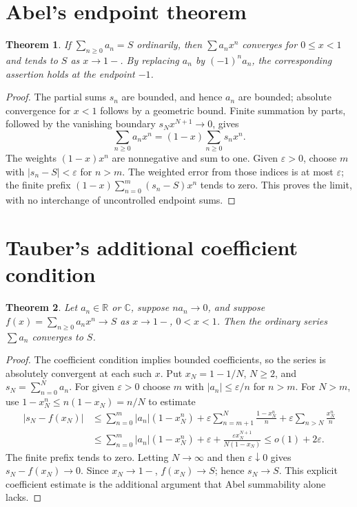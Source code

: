 \documentclass[11pt,oneside,a4paper]{book}
\newtheorem{theorem}{Theorem}[chapter]
\theoremstyle{definition}
\theoremstyle{remark}
\newcommand{\R}{\mathbb R}
\newcommand{\C}{\mathbb C}
\newcommand{\eps}{\varepsilon}
\newcommand{\abs}[1]{\lvert#1\rvert}
\newcommand{\KEntry}[2]{\Needspace{7\baselineskip}\section{#2}\label{#1}{\small\sffamily\color{black!60}\detokenize{#1}}\par}
\begin{document}
\KEntry{K03.13.abel}{Abel's endpoint theorem}
\begin{theorem}
If $\sum_{n\geq0}a_n=S$ ordinarily, then $\sum a_nx^n$ converges for $0\leq x<1$ and tends to $S$ as $x\to1-$. By replacing $a_n$ by $(-1)^na_n$, the corresponding assertion holds at the endpoint $-1$.
\end{theorem}
\begin{proof}
The partial sums $s_n$ are bounded, and hence $a_n$ are bounded; absolute convergence for $x<1$ follows by a geometric bound. Finite summation by parts, followed by the vanishing boundary $s_Nx^{N+1}\to0$, gives
\[\sum_{n\geq0}a_nx^n=(1-x)\sum_{n\geq0}s_nx^n.\]
The weights $(1-x)x^n$ are nonnegative and sum to one. Given $\eps>0$, choose $m$ with $\abs{s_n-S}<\eps$ for $n>m$. The weighted error from those indices is at most $\eps$; the finite prefix $(1-x)\sum_{n=0}^m(s_n-S)x^n$ tends to zero. This proves the limit, with no interchange of uncontrolled endpoint sums.
\end{proof}

\KEntry{K03.13.tauber}{Tauber's additional coefficient condition}
\begin{theorem}
Let $a_n\in\R$ or $\C$, suppose $na_n\to0$, and suppose $f(x)=\sum_{n\geq0}a_nx^n\to S$ as $x\to1-$, $0<x<1$. Then the ordinary series $\sum a_n$ converges to $S$.
\end{theorem}
\begin{proof}
The coefficient condition implies bounded coefficients, so the series is absolutely convergent at each such $x$. Put $x_N=1-1/N$, $N\geq2$, and $s_N=\sum_{n=0}^Na_n$. For given $\eps>0$ choose $m$ with $\abs{a_n}\leq\eps/n$ for $n>m$. For $N>m$, use $1-x_N^n\leq n(1-x_N)=n/N$ to estimate
\[\begin{split}
\abs{s_N-f(x_N)}&\leq\sum_{n=0}^m\abs{a_n}(1-x_N^n)
+\eps\sum_{n=m+1}^N\frac{1-x_N^n}{n}
+\eps\sum_{n>N}\frac{x_N^n}{n}\\
&\leq\sum_{n=0}^m\abs{a_n}(1-x_N^n)+\eps+\frac{\eps x_N^{N+1}}{N(1-x_N)}\leq o(1)+2\eps.
\end{split}\]
The finite prefix tends to zero. Letting $N\to\infty$ and then $\eps\downarrow0$ gives $s_N-f(x_N)\to0$. Since $x_N\to1-$, $f(x_N)\to S$; hence $s_N\to S$. This explicit coefficient estimate is the additional argument that Abel summability alone lacks.
\end{proof}
\end{document}
